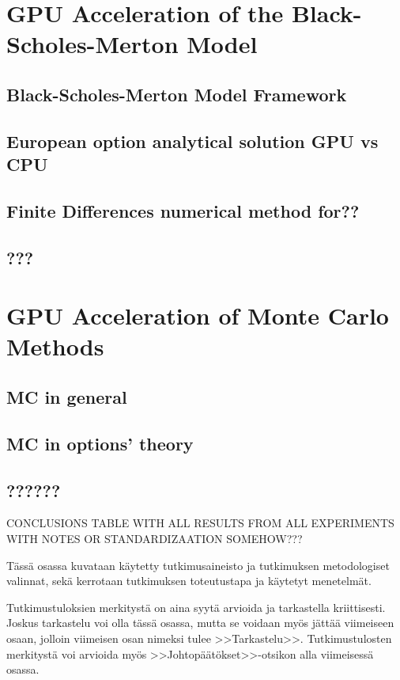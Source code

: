 \documentclass[english,12pt,a4paper,pdftex,sci,utf8]{aaltothesis}
\begin{document}
\section{GPU Acceleration of the Black-Scholes-Merton Model} \label{sec:gpu-bsm}
\subsection{Black-Scholes-Merton Model Framework}
\subsection{European option analytical solution GPU vs CPU}
\subsection{Finite Differences numerical method for??}
\subsection{???}

\section{GPU Acceleration of Monte Carlo Methods} \label{sec:gpu-mc}
\subsection{MC in general}
\subsection{MC in options' theory}
\subsection{??????}

CONCLUSIONS TABLE WITH ALL RESULTS FROM ALL EXPERIMENTS WITH NOTES OR STANDARDIZAATION  SOMEHOW???

T\"ass\"a osassa kuvataan k\"aytetty tutkimusaineisto ja
tutkimuksen metodologiset valinnat, sek\"a
kerrotaan tutkimuksen toteutustapa ja k\"aytetyt menetelm\"at. 

\clearpage


Tutkimustuloksien merkityst\"a on aina syyt\"a arvioida ja tarkastella
kriittisesti.  Joskus tarkastelu voi olla t\"ass\"a osassa, mutta se
voidaan my\"os j\"att\"a\"a viimeiseen osaan, jolloin viimeisen osan nimeksi
tulee >>Tarkastelu>>. Tutkimustulosten merkityst\"a voi arvioida my\"os
>>Johtop\"a\"at\"okset>>-otsikon alla viimeisess\"a osassa. 
\end{document}
